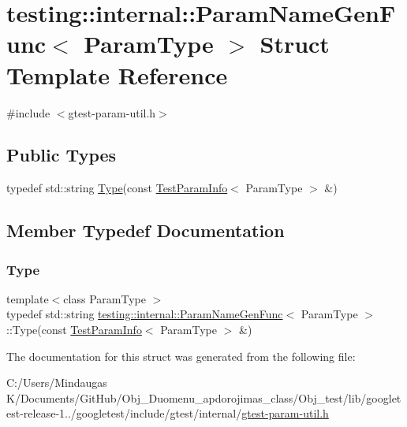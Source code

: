 \hypertarget{structtesting_1_1internal_1_1_param_name_gen_func}{}\section{testing\+::internal\+::Param\+Name\+Gen\+Func$<$ Param\+Type $>$ Struct Template Reference}
\label{structtesting_1_1internal_1_1_param_name_gen_func}


{\ttfamily \#include $<$gtest-\/param-\/util.\+h$>$}

\subsection*{Public Types}
\begin{DoxyCompactItemize}
\item 
typedef std\+::string \mbox{\hyperlink{structtesting_1_1internal_1_1_param_name_gen_func_adf1ce5df22a930ae715082862d72590f}{Type}}(const \mbox{\hyperlink{structtesting_1_1_test_param_info}{Test\+Param\+Info}}$<$ Param\+Type $>$ \&)
\end{DoxyCompactItemize}


\subsection{Member Typedef Documentation}
\mbox{\label{structtesting_1_1internal_1_1_param_name_gen_func_adf1ce5df22a930ae715082862d72590f}} 
\subsubsection{\texorpdfstring{Type}{Type}}
{\footnotesize\ttfamily template$<$class Param\+Type $>$ \\
typedef std\+::string \mbox{\hyperlink{structtesting_1_1internal_1_1_param_name_gen_func}{testing\+::internal\+::\+Param\+Name\+Gen\+Func}}$<$ Param\+Type $>$\+::Type(const \mbox{\hyperlink{structtesting_1_1_test_param_info}{Test\+Param\+Info}}$<$ Param\+Type $>$ \&)}



The documentation for this struct was generated from the following file\+:\begin{DoxyCompactItemize}
\item 
C\+:/\+Users/\+Mindaugas K/\+Documents/\+Git\+Hub/\+Obj\+\_\+\+Duomenu\+\_\+apdorojimas\+\_\+class/\+Obj\+\_\+test/lib/googletest-\/release-\/1../googletest/include/gtest/internal/\mbox{\hyperlink{_obj__test_2lib_2googletest-release-1_88_81_2googletest_2include_2gtest_2internal_2gtest-param-util_8h}{gtest-\/param-\/util.\+h}}\end{DoxyCompactItemize}
